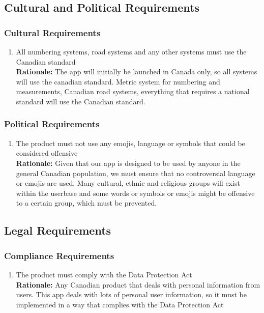 \documentclass[]{article}
\begin{document}

\subsection{Cultural and Political Requirements}
\label{sub:cultural_and_political_requirements}

\subsubsection{Cultural Requirements}
\label{ssub:cultural_requirements}
\begin{enumerate}[{CP-C}1. ]
	\item All numbering systems, road systems and any other systems must use the Canadian standard \\
	{\bf Rationale:} The app will initially be launched in Canada only, so all systems will use the canadian standard. Metric system for numbering and measurements, Canadian road systems, everything that requires a national standard will use the Canadian standard.
\end{enumerate}

\subsubsection{Political Requirements}
\label{ssub:political_requirements}
\begin{enumerate}[{CP-P}1. ]
	\item The product must not use any emojis, language or symbols that could be considered offensive \\
	{\bf Rationale:} Given that our app is designed to be used by anyone in the general Canadian population, we must ensure that no controversial language or emojis are used. Many cultural, ethnic and religious groups will exist within the userbase and some words or symbols or emojis might be offensive to a certain group, which must be prevented.
\end{enumerate}


\subsection{Legal Requirements}
\label{sub:legal_requirements}

\subsubsection{Compliance Requirements}
\label{ssub:compliance_requirements}
\begin{enumerate}[{LR-COMP}1. ]
	\item The product must comply with the Data Protection Act \\
	{\bf Rationale:} Any Canadian product that deals with personal information from users. This app deals with lots of personal user information, so it must be implemented in a way that complies with the Data Protection Act
\end{enumerate}
\end{document}
